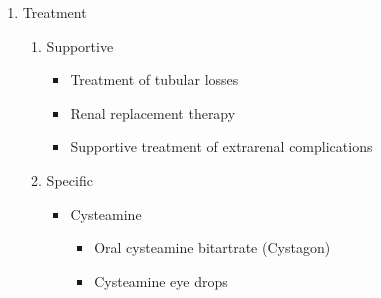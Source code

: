 \documentclass{scrartcl}
\begin{document}
\begin{enumerate}
\item Treatment
\label{sec:orgffa6638}
\begin{enumerate}
\item Supportive
\label{sec:org72ae6d6}
\begin{itemize}
\item Treatment of tubular losses
\item Renal replacement therapy
\item Supportive treatment of extrarenal complications
\end{itemize}
\item Specific
\label{sec:orgf93ec08}
\begin{itemize}
\item Cysteamine
\begin{itemize}
\item Oral cysteamine bitartrate (Cystagon)
\item Cysteamine eye drops
\end{itemize}
\end{itemize}
\end{enumerate}
\end{enumerate}
\end{document}
